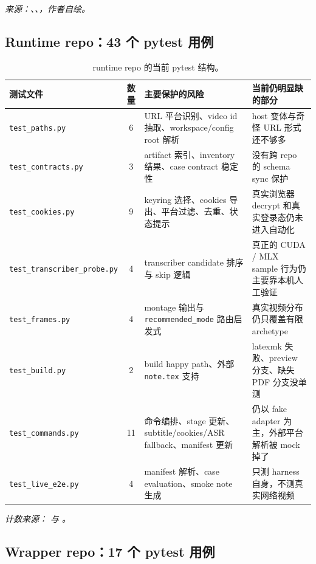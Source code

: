 \documentclass[a4paper]{article}
\begin{document}
\noindent\small\emph{来源：、、，作者自绘。}\normalsize

\subsection{Runtime repo：43 个 pytest 用例}

\begin{table}[H]
\centering
\small
\begin{tabularx}{\textwidth}{>{\raggedright\arraybackslash}p{2.6cm}cYY}
\toprule
测试文件 & 数量 & 主要保护的风险 & 当前仍明显缺的部分 \\
\midrule
\texttt{test\_paths.py} & 6 & URL 平台识别、video id 抽取、workspace/config root 解析 & host 变体与奇怪 URL 形式还不够多 \\
\texttt{test\_contracts.py} & 3 & artifact 索引、inventory 结果、case contract 稳定性 & 没有跨 repo 的 schema sync 保护 \\
\texttt{test\_cookies.py} & 9 & keyring 选择、cookies 导出、平台过滤、去重、状态提示 & 真实浏览器 decrypt 和真实登录态仍未进入自动化 \\
\texttt{test\_transcriber\_probe.py} & 4 & transcriber candidate 排序与 skip 逻辑 & 真正的 CUDA / MLX sample 行为仍主要靠本机人工验证 \\
\texttt{test\_frames.py} & 4 & montage 输出与 \texttt{recommended\_mode} 路由启发式 & 真实视频分布仍只覆盖有限 archetype \\
\texttt{test\_build.py} & 2 & build happy path、外部 \texttt{note.tex} 支持 & latexmk 失败、preview 分支、缺失 PDF 分支没单测 \\
\texttt{test\_commands.py} & 11 & 命令编排、stage 更新、subtitle/cookies/ASR fallback、manifest 更新 & 仍以 fake adapter 为主，外部平台解析被 mock 掉了 \\
\texttt{test\_live\_e2e.py} & 4 & manifest 解析、case evaluation、smoke note 生成 & 只测 harness 自身，不测真实网络视频 \\
\bottomrule
\end{tabularx}
\caption{runtime repo 的当前 pytest 结构。}
\end{table}

\noindent\small\emph{计数来源： 与 。}\normalsize

\subsection{Wrapper repo：17 个 pytest 用例}
\end{document}

